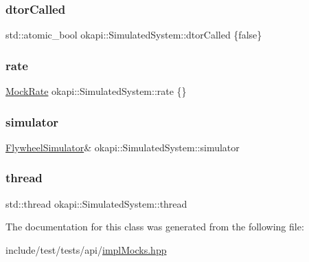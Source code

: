 \subsubsection{\texorpdfstring{dtorCalled}{dtorCalled}}
{\footnotesize\ttfamily std\+::atomic\+\_\+bool okapi\+::\+Simulated\+System\+::dtor\+Called \{false\}}

\mbox{\label{classokapi_1_1SimulatedSystem_a476dcbc29e5b7f6183cba06093fc1733}} 
\subsubsection{\texorpdfstring{rate}{rate}}
{\footnotesize\ttfamily \mbox{\hyperlink{classokapi_1_1MockRate}{Mock\+Rate}} okapi\+::\+Simulated\+System\+::rate \{\}}

\mbox{\label{classokapi_1_1SimulatedSystem_a8a0976ed11f951daf4edbca13e0fa6a5}} 
\subsubsection{\texorpdfstring{simulator}{simulator}}
{\footnotesize\ttfamily \mbox{\hyperlink{classokapi_1_1FlywheelSimulator}{Flywheel\+Simulator}}\& okapi\+::\+Simulated\+System\+::simulator}

\mbox{\label{classokapi_1_1SimulatedSystem_a96840ae0f377de974e33f3d400f94205}} 
\subsubsection{\texorpdfstring{thread}{thread}}
{\footnotesize\ttfamily std\+::thread okapi\+::\+Simulated\+System\+::thread}



The documentation for this class was generated from the following file\+:\begin{DoxyCompactItemize}
\item 
include/test/tests/api/\mbox{\hyperlink{implMocks_8hpp}{impl\+Mocks.\+hpp}}\end{DoxyCompactItemize}
